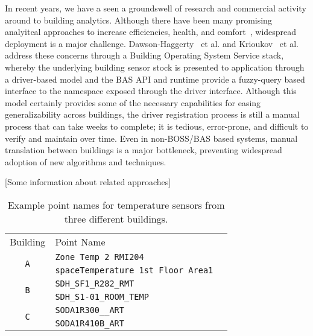 In recent years, we have a seen a groundswell of research and commercial activity around to building
analytics\cite{}.  Although there have been many promising analyitcal approaches to increase
efficiencies, health, and comfort~\cite{}, widespread deployment is a major challenge.  Dawson-Haggerty~\cite{boss} et al.
and Krioukov~\cite{bas} et al. address these concerns through a Building Operating System Service stack, whereby
the underlying building sensor stock is presented to application through a driver-based model and the 
BAS API and runtime provide a fuzzy-query based interface to the namespace exposed through the driver interface.
Although this model certainly provides some of the necessary capabilities for easing generalizability across
buildings, the driver registration process is still a manual process that can take weeks to complete;
it is tedious, error-prone, and difficult to verify and maintain over time.  Even in non-BOSS/BAS based systems, manual
translation between buildings is a major bottleneck, preventing widespread adoption of new algorithms and techniques.

[Some information about related approaches]







\begin{table}[h]
\centering
\begin{tabular}{c|ll}
\cline{1-2}
Building & Point Name & \\
\cline{1-2}
\multirow{2}{*}{\texttt{A}}  & \texttt{Zone Temp 2 RMI204} &  \\
					& \texttt{spaceTemperature 1st Floor Area1} &  \\ \cline{1-2}
\multirow{2}{*}{\texttt{B}} & \texttt{SDH\_SF1\_R282\_RMT} &  \\
                     & \texttt{SDH\_S1-01\_ROOM\_TEMP} &  \\ \cline{1-2}
\multirow{2}{*}{\texttt{C}}  & \texttt{SODA1R300\_\_ART} &  \\
					  & \texttt{SODA1R410B\_ART} &  \\ \cline{1-2}
\end{tabular}
\caption{Example point names for temperature sensors from three different buildings.}
\label{table:ex}
\end{table}



